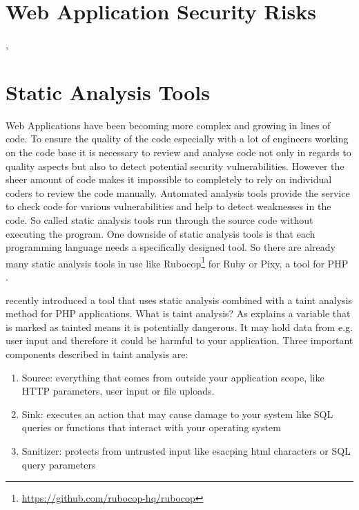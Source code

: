 \section{Web Application Security Risks}
\autocite[]{ElIdrissi2017}, \autocite[]{Li2014}
\section{Static Analysis Tools}
Web Applications have been becoming more complex and growing in lines of code. To ensure the quality of the code especially with a lot of engineers working on the code base it is necessary to review and analyse code not only in regards to quality aspects but also to detect potential security vulnerabilities. However the sheer amount of code makes it impossible to completely to rely on individual coders to review the code manually. Automated analysis tools provide the service to check code for various vulnerabilities and help to detect weaknesses in the code. So called static analysis tools run through the source code without executing the program. One downside of static analysis tools is that each programming language needs a specifically designed tool. So there are already many static analysis tools in use like Rubocop\footnote{ \url{https://github.com/rubocop-hq/rubocop}} for Ruby or Pixy, a tool for PHP \autocite[]{Jovanovic2006}.\newline



\textcite[]{Maskur2019} recently introduced a tool that uses static analysis combined with a taint analysis method for PHP applications. What is taint analysis? As \textcite[]{Shannon2018} explains a variable that is marked as tainted means it is potentially dangerous. It may hold data from e.g. user input and therefore it could be harmful to your application. Three important components described in taint analysis are:

\begin{enumerate}
    \item Source: everything that comes from outside your application scope, like HTTP parameters, user input or file uploads.
    \item Sink: executes an action that may cause damage to your system like SQL queries or functions that interact with your operating system
    \item Sanitizer: protects from untrusted input like esacping html characters or SQL query parameters
\end{enumerate}

